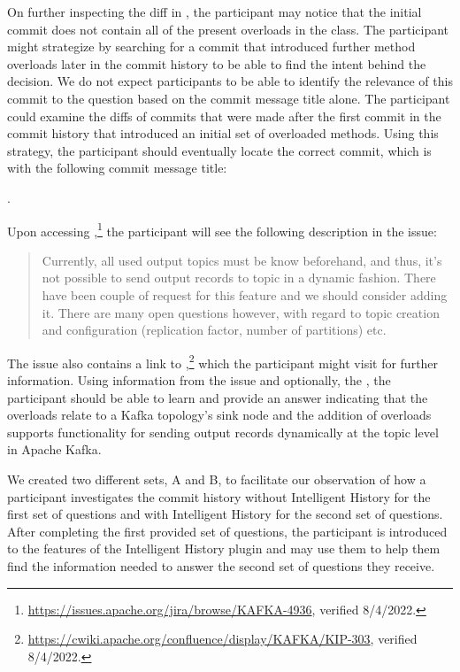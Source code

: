 On further inspecting the diff in ,
the participant may notice that the initial commit does not contain all of the present
 overloads in the class.
The participant might strategize by searching for a commit that introduced further  method overloads 
later in the commit history to be able to find the intent behind the decision.
We do not expect participants to be able to identify the relevance of this commit to the question 
based on the commit message title alone.
The participant could examine the diffs of commits
that were made after the first commit in the  commit history 
that introduced an initial set of overloaded  methods.
Using this strategy, the participant should eventually locate the correct commit,
which is  with the following commit message title:

\begin{center}
  .
\end{center}

Upon accessing ,\footnote{\url{https://issues.apache.org/jira/browse/KAFKA-4936}, verified 8/4/2022.} the participant will see the following description in the issue:

\begin{quote}
  \textsf{
    Currently, all used output topics must be know beforehand, and thus, it's not possible to send output records to topic in a dynamic fashion.
    There have been couple of request for this feature and we should consider adding it.
    There are many open questions however, with regard to topic creation and configuration (replication factor, number of partitions) etc.
  }
\end{quote}

The issue also contains a  link to ,\footnote{\url{https://cwiki.apache.org/confluence/display/KAFKA/KIP-303}, verified 8/4/2022.}
which the participant might visit for further information.
Using information from the issue and optionally, the , 
the participant should be able to learn and provide an answer indicating that
the overloads relate to a Kafka topology's sink node and the addition of overloads
supports functionality for sending output records dynamically at the topic level in Apache Kafka.

We created two different sets, A and B, to facilitate our observation
of how a participant investigates the commit history without Intelligent History
for the first set of questions and with Intelligent History for the second set of questions.
After completing the first provided set of questions, 
the participant is introduced to the features of the Intelligent History plugin 
and may use them to help them find the information needed to answer 
the second set of questions they receive.

